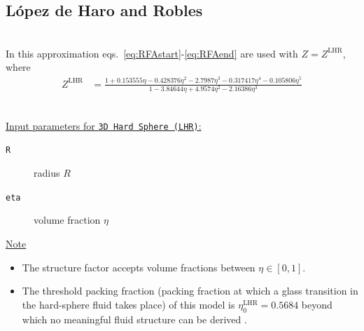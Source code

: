 \clearpage
\subsection{L\'{o}pez de Haro and Robles} \cite{Robles2003} ~\\

\noindent In this approximation eqs.\ \ref{eq:RFAstart}-\ref{eq:RFAend} are used with $Z=Z^\mathrm{LHR}$, where
\begin{align}
Z^\mathrm{LHR} &= \frac{1   + 0.153555\eta
                            - 0.428376\eta^2
                            - 2.7987\eta^3
                            - 0.317417\eta^4
                            - 0.105806\eta^5}{1-3.84644\eta + 4.9574\eta^2 - 2.16386\eta^3}
\end{align}

\vspace{5mm}

\hspace{1pt}\\
\underline{Input parameters for \texttt{3D Hard Sphere (LHR)}:}
\begin{description}
    \item[\texttt{R}]  radius $R$
    \item[\texttt{eta}] volume fraction $\eta$
\end{description}

\noindent
\underline{Note}
\begin{itemize}
\item The structure factor accepts volume fractions between $\eta \in [0,1]$.
\item The threshold packing fraction (packing
fraction at which a glass transition in the hard-sphere fluid takes place) of this model is $\eta^\mathrm{LHR}_0 = 0.5684$  beyond
which no meaningful fluid structure can be derived \cite{Haro2004}.
\end{itemize}

